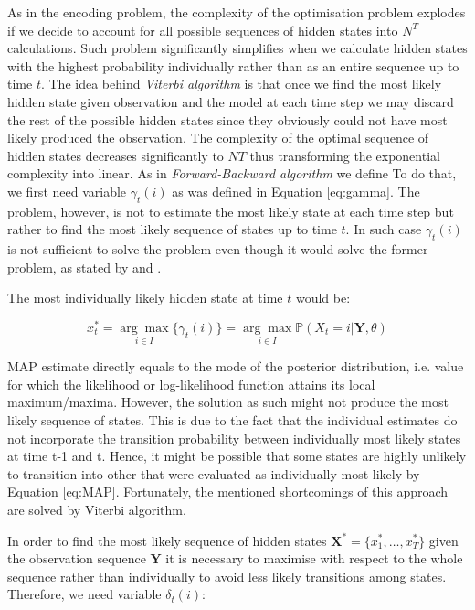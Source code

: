 As in the encoding problem, the complexity of the optimisation problem explodes if we decide to account for all possible sequences of hidden states into $N^T$ calculations. 
Such problem significantly simplifies when we calculate hidden states with the highest probability individually rather than as an entire sequence up to time $t$. 
The idea behind \textit{Viterbi algorithm} is that once we find the most likely hidden state given observation and the model at each time step 
we may discard the rest of the possible hidden states since they obviously could not have most likely produced the observation. The complexity of the optimal 
sequence of hidden states decreases significantly to $NT$ thus transforming the exponential complexity into linear. As in \textit{Forward-Backward algorithm} we define 
To do that, we first need variable $\gamma_t(i)$ as was defined in Equation \ref{eq:gamma}. The problem, however, is not to estimate the most likely state at each time step
but rather to find the most likely sequence of states up to time $t$. In such case $\gamma_t(i)$ is not sufficient to solve the problem even though it would solve the former problem, as stated by \citep{Rabiner1989} and \citep{Oliver2013}.

The most individually likely hidden state at time $t$ would be:

\begin{equation}
    x_t^* = \underset{i \in I}{\arg\max} \{\gamma_t(i)\} = \underset{i \in I}{\arg\max} \mathbb{P}(X_t=i|\textbf{Y},\theta)
\end{equation}

MAP estimate directly equals to the mode of the posterior distribution, i.e. value for which the likelihood or log-likelihood function attains its local maximum/maxima. 
However, the solution as such might not produce the most likely sequence of states. This is due to the fact that the individual estimates do not incorporate 
the transition probability between individually most likely states at time t-1 and t. Hence, it might be possible that some states are highly unlikely to transition 
into other that were evaluated as individually most likely by Equation \ref{eq:MAP}. Fortunately, the mentioned shortcomings of this approach are solved by Viterbi algorithm.

In order to find the most likely sequence of hidden states $\textbf{X}^*=\{x_1^*,\ldots,x_T^*\}$ given the observation sequence $\textbf{Y}$ it is necessary 
to maximise with respect to the whole sequence rather than individually to avoid less likely transitions among states.
Therefore, we need variable $\delta_t(i)$:

